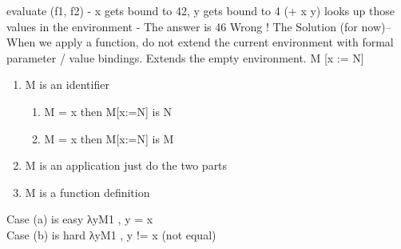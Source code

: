 \documentclass{article}
\begin{document}
\newline
\newline
evaluate (f1, f2) - x gets bound to 42, y gets bound to 4
\newline
\newline
(+ x y) looks up those values in the environment - The answer is 46 Wrong !
\newline
\newline
The Solution (for now)-- When we apply a function, do not extend the current environment with formal parameter / value bindings. Extends the empty environment.
\newline
\newline
\newline
\newline
M [x := N]
\begin{enumerate}
    \item M is an identifier 
    \begin{enumerate}
    \item M = x  then M[x:=N] is N
    \item M = x  then M[x:=N] is M
    \end{enumerate}
    \item M is an application just do the two parts 
    \item M is a function definition
\end{enumerate}
\newline
\newline
Case (a) is easy λyM1 , y = x \\
Case (b) is hard λyM1 , y != x (not equal)
\newline
\newline
\end{document}
